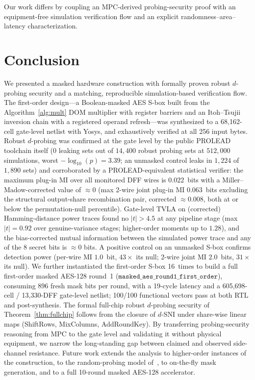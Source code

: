 \documentclass[lettersize,journal]{IEEEtran}
\begin{document}
Our work differs by coupling an MPC-derived probing-security proof with
an equipment-free simulation verification flow and an explicit
randomness--area--latency characterization.

\section{Conclusion}
\label{sec:conclusion}
We presented a masked hardware construction with formally proven
robust $d$-probing security and a matching, reproducible
simulation-based verification flow.  The first-order design---a
Boolean-masked AES S-box built from the Algorithm~\ref{alg:mult} DOM
multiplier with register barriers and an Itoh--Tsujii inversion chain
with a registered operand refresh---was synthesized to a
68{,}162-cell gate-level netlist with Yosys,
and exhaustively verified at all 256 input bytes.  Robust
$d$-probing was confirmed at the gate level by the public PROLEAD
toolchain itself ($0$ leaking sets out of $14{,}400$ robust probing
sets at $512{,}000$ simulations, worst $-\log_{10}(p)=3.39$; an
unmasked control leaks in $1{,}224$ of $1{,}890$ sets) and
corroborated by a PROLEAD-equivalent
statistical verifier: the maximum plug-in MI over all monitored DFF
wires is
$0.022$~bits with a Miller--Madow-corrected value of $\approx 0$
(max 2-wire joint plug-in MI $0.063$~bits excluding the structural
output-share recombination pair, corrected $\approx 0.008$,
both at or below the permutation-null percentile).  Gate-level TVLA on
(corrected) Hamming-distance power traces
found no $|t|{>}4.5$ at any pipeline stage (max $|t| = 0.92$ over
genuine-variance stages; higher-order moments up to $1.28$),
and the bias-corrected mutual information between the simulated power
trace and any of the 8 secret bits is $\approx 0$ bits.  A positive
control on an unmasked S-box confirms detection power (per-wire MI
$1.0$~bit, $43\times$ its null; 2-wire joint MI $2.0$~bits,
$31\times$ its null).
We further
instantiated the first-order S-box 16~times to build a full
first-order masked AES-128 round~1 ($\texttt{masked\_aes\_round1\_first\_order}$),
consuming $896$ fresh mask bits per round, with a 19-cycle
latency and a 605{,}698-cell / 13{,}330-DFF gate-level
netlist; 100/100 functional vectors pass at both RTL and
post-synthesis.  The formal
full-chip robust $d$-probing security of
Theorem~\ref{thm:fullchip} follows from the closure of $d$-SNI
under share-wise linear maps (ShiftRows, MixColumns,
AddRoundKey).  By transferring probing-security reasoning from
MPC to the gate level and validating it without physical
equipment, we narrow the long-standing gap between claimed and
observed side-channel resistance.  Future work extends the
analysis to higher-order instances of the construction, to the
random-probing model of~\cite{belaid2020random},
to on-the-fly mask generation, and to a full 10-round masked
AES-128 accelerator.
\end{document}
